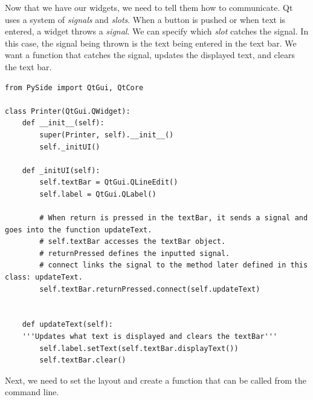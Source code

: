 Now that we have our widgets, we need to tell them how to communicate.
Qt uses a system of \emph{signals} and \emph{slots}.
When a button is pushed or when text is entered, a widget throws a \emph{signal}.
We can specify which \emph{slot} catches the signal.
In this case, the signal being thrown is the text being entered in the text bar. We want a function that catches the signal, updates the displayed text, and clears the text bar.

\begin{lstlisting}
from PySide import QtGui, QtCore

class Printer(QtGui.QWidget):
	def __init__(self):
		super(Printer, self).__init__()
		self._initUI()

	def _initUI(self):
		self.textBar = QtGui.QLineEdit()
		self.label = QtGui.QLabel()
		
		# When return is pressed in the textBar, it sends a signal and goes into the function updateText.
        # self.textBar accesses the textBar object.
        # returnPressed defines the inputted signal.
        # connect links the signal to the method later defined in this class: updateText.
		self.textBar.returnPressed.connect(self.updateText)
	
		
	def updateText(self):
	'''Updates what text is displayed and clears the textBar'''
		self.label.setText(self.textBar.displayText())
		self.textBar.clear()

\end{lstlisting}

Next, we need to set the layout and create a function that can be called from the command line.

